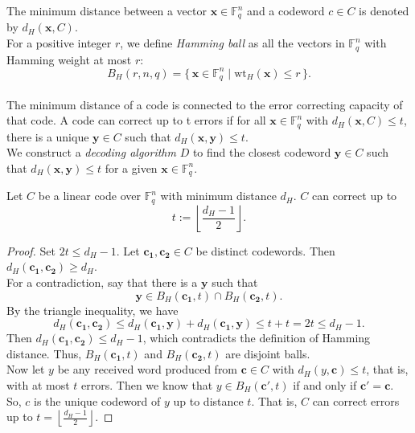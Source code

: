 The minimum distance between a vector $\mathbf{x} \in \mathbb{F}_q^n$ and a codeword $c \in C$ is denoted by $d_H(\mathbf{x}, C)$.\\[0.4cm]
For a positive integer $r$, we define \emph{Hamming ball} as all the vectors in $\mathbb{F}_q^n$ with Hamming weight at most $r$:
\[
B_H(r, n, q) =
\{\, \mathbf{x} \in \mathbb{F}_q^n \mid 
\mathrm{wt}_H(\textbf{x}) \leq \textit{r}\,\}.
\]
\\[0.4cm]
The minimum distance of a code is connected to the error correcting capacity of that code. A code can correct up to t errors if for all
$\mathbf{x} \in \mathbb{F}_q^n$ with $d_H(\mathbf{x}, C) \leq t$, there is a unique $\mathbf{y} \in C$ such that $d_H(\mathbf{x}, \mathbf{y}) \leq t$.\\[0.4cm]
We construct a \textit{decoding algorithm} $D$ to find the closest codeword $\mathbf{y} \in C$ such that $d_H(\mathbf{x}, \mathbf{y}) \leq t$ for a given
$\mathbf{x} \in \mathbb{F}_q^n$.\\[0.4cm]
\begin{proposition}
Let $C$ be a linear code over $\mathbb{F}_q^n$ with minimum distance $d_H$. $C$ can correct up to 
\[
t := \left\lfloor\frac{d_H - 1}{2}\right\rfloor.
\]
\end{proposition}

\begin{proof}
Set $2t\leq d_H-1$. Let $\mathbf{c_1}, \mathbf{c_2}\in C$ be distinct codewords. Then $d_H(\mathbf{c_1},\mathbf{c_2})\geq d_H$.\\
For a contradiction, say that there is a $\mathbf{y}$ such that
\[
\mathbf{y}\in B_H(\mathbf{c_1}, t) \cap B_H(\mathbf{c_2}, t).
\]
By the triangle inequality, we have
\[
d_H(\mathbf{c_1}, \mathbf{c_2})\leq d_H(\mathbf{c_1},\mathbf{y}) +d_H(\mathbf{c_1},\mathbf{y})\leq t+t=2t\leq d_H-1. 
\]
Then $d_H(\mathbf{c_1}, \mathbf{c_2})\leq d_H-1$, which contradicts the definition of Hamming distance. Thus, $B_H(\mathbf{c_1}, t)$ and $B_H(\mathbf{c_2}, t)$ are disjoint balls.\\[0.2cm]
Now let $y$ be any received word produced from $\mathbf{c}\in C$ with $d_H(y, \mathbf{c})\leq t$, that is, with at most $t$ errors. Then we know that $y\in B_H(\mathbf{c'}, t)$ if and only if $\mathbf{c'}=\mathbf{c}$. So, $c$ is the unique codeword of $y$ up to distance $t$. That is, $C$ can correct errors up to $t = \left\lfloor\frac{d_H - 1}{2}\right\rfloor$. 
\end{proof}


